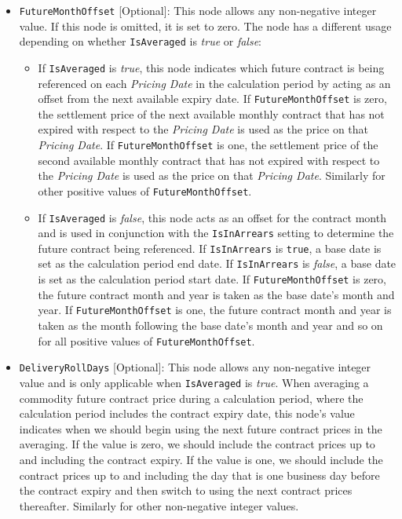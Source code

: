 \begin{itemize}
\item
\lstinline!FutureMonthOffset! [Optional]: This node allows any non-negative integer value. If this node is omitted, it is set to zero. The node has a different usage depending on whether \lstinline!IsAveraged! is \emph{true} or \emph{false}:
\begin{itemize}
  \item If \lstinline!IsAveraged! is \emph{true}, this node indicates which future contract is being referenced on each \textit{Pricing Date} in the calculation period by acting as an offset from the next available expiry date. If \lstinline!FutureMonthOffset! is zero, the settlement price of the next available monthly contract that has not expired with respect to the \textit{Pricing Date} is used as the price on that \textit{Pricing Date}. If \lstinline!FutureMonthOffset! is one, the settlement price of the second available monthly contract that has not expired with respect to the \textit{Pricing Date} is used as the price on that \textit{Pricing Date}. Similarly for other positive values of \lstinline!FutureMonthOffset!.
  \item If \lstinline!IsAveraged! is \emph{false}, this node acts as an offset for the contract month and is used in conjunction with the \lstinline!IsInArrears! setting to determine the future contract being referenced. If \lstinline!IsInArrears! is \lstinline!true!, a base date is set as the calculation period end date. If \lstinline!IsInArrears! is \emph{false}, a base date is set as the calculation period start date. If \lstinline!FutureMonthOffset! is zero, the future contract month and year is taken as the base date's month and year. If \lstinline!FutureMonthOffset! is one, the future contract month and year is taken as the month following the base date's month and year and so on for all positive values of \lstinline!FutureMonthOffset!.
\end{itemize}

\item
\lstinline!DeliveryRollDays! [Optional]: This node allows any non-negative integer value and is only applicable when \lstinline!IsAveraged! is \emph{true}. When averaging a commodity future contract price during a calculation period, where the calculation period includes the contract expiry date, this node's value indicates when we should begin using the next future contract prices in the averaging. If the value is zero, we should include the contract prices up to and including the contract expiry. If the value is one, we should include the contract prices up to and including the day that is one business day before the contract expiry and then switch to using the next contract prices thereafter. Similarly for other non-negative integer values. 


\end{itemize}
